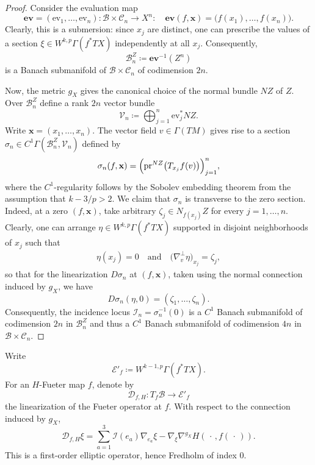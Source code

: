 \documentclass[11pt,a4paper]{article}
\theoremstyle{definition}
\newcommand{\pr}{\textnormal{pr}}
\newcommand{\eand}{\quad \text{and} \quad}
\newcommand{\cE}{\mathcal{E}}
\newcommand{\cC}{\mathcal{C}}
\newcommand{\cD}{\mathcal{D}}
\newcommand{\cI}{\mathcal{I}}
\newcommand{\cB}{\mathcal{B}}
\newcommand{\cV}{\mathcal{V}}
\newcommand{\bx}{\mathbf{x}}
\newcommand{\bev}{\mathbf{ev}}
\newcommand{\ev}{\mathrm{ev}}
\begin{document}
\begin{proof}
    Consider the evaluation map
  \begin{equation*}
    \bev=(\ev_1, \dots, \ev_n): \cB \times \cC_n \to X^n: \quad \bev(f, \bx) = \Big(f(x_1), \dots, f(x_n) \Big).
  \end{equation*}
  Clearly, this is a submersion: since $x_j$ are distinct, one can prescribe the values of a section $\xi \in W^{k,p} \Gamma(f^*TX)$ independently at all $x_j$. Consequently, 
  \begin{equation*}
    \cB^Z_n \coloneq \bev^{-1}(Z^n)
  \end{equation*}
  is a Banach submanifold of $\cB \times \cC_n$ of codimension $2n$.

  Now, the metric $g_X$ gives the canonical choice of the normal bundle $NZ$ of $Z$. Over $\cB^Z_n$ define a rank $2n$ vector bundle
  \begin{equation*}
    \cV_n \coloneq \bigoplus_{j=1}^n \ev_j^* NZ.
  \end{equation*}
  Write $\bx = (x_1, \dots, x_n)$. The vector field $v\in \Gamma(TM)$ gives rise to a section $\sigma_n \in C^1\Gamma(\cB^Z_n, \cV_n)$ defined by 
  \begin{equation*}
    \sigma_n(f, \bx) = \Big(\pr^{NZ}\big(T_{x_j}f(v)\big) \Big)_{j=1}^n,
  \end{equation*}
  where the $C^1$-regularity follows by the Sobolev embedding theorem from the assumption  that $k-3/p>2$. We claim that $\sigma_n$ is transverse to the zero section. Indeed, at a zero $(f, \bx)$, take arbitrary $\zeta_j \in N_{f(x_j)}Z$ for every $j=1, \dots, n$. Clearly, one can arrange $\eta \in W^{k, p}\Gamma(f^*TX)$ supported in disjoint neighborhoods of $x_j$ such that 
  \begin{align*}
    \eta(x_j)=0 \eand \big(\nabla_v^\perp \eta\big)_{x_j} = \zeta_j,
  \end{align*}
  so that for the linearization $D\sigma_n$ at $(f, \bx)$, taken using the normal connection induced by $g_X$, we have
  \begin{equation*}
    D\sigma_n(\eta, 0) = (\zeta_1, \dots, \zeta_n).
  \end{equation*}
  Consequently, the incidence locus $\cI_n = \sigma_n^{-1}(0)$ is a $C^1$ Banach submanifold of codimension $2n$ in $\cB_n^Z$ and thus a $C^1$ Banach submanifold of codimension $4n$ in $\cB \times \cC_n$.
\end{proof}

Write 
\begin{equation*}
  \cE'_f \coloneq W^{k-1,p}\Gamma(f^*TX).
\end{equation*}
For an $H$-Fueter map $f$, denote by 
\begin{equation*}
  \cD_{f, H}: T_f \cB \to \cE'_f
\end{equation*}
the linearization of the Fueter operator at $f$. With respect to the connection induced by $g_X$,
\begin{equation*}
  \cD_{f, H} \xi = \sum_{a=1}^3 \cI(e_a) \nabla_{e_a} \xi - \nabla_{\xi} \nabla^{g_X} H(\, \cdot \, , f (\,\cdot \,)).
\end{equation*}
This is a first-order elliptic operator, hence Fredholm of index $0$.
\end{document}
